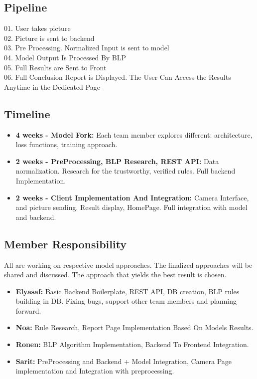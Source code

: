 \documentclass[12pt,a4paper]{article}
\begin{document}
\subsection{Pipeline}
01. User takes picture\\
02. Picture is sent to backend\\
03. Pre Processing. Normalized Input is sent to model\\
04. Model Output Is Processed By BLP\\
05. Full Results are Sent to Front\\
06. Full Conclusion Report is Displayed. The User Can Access the Results Anytime in the Dedicated Page

\subsection{Timeline}
\begin{itemize}
    \item \textbf{4 weeks - Model Fork:} Each team member explores different: architecture, loss functions, training approach.
    \item \textbf{2 weeks - PreProcessing, BLP Research, REST API:} Data normalization. Research for the trustworthy, verified rules. Full backend Implementation.
    \item \textbf{2 weeks - Client Implementation And Integration:} Camera Interface, and picture sending. Result display, HomePage. Full integration with model and backend.
\end{itemize}

\subsection{Member Responsibility}
All are working on respective model approaches. The finalized approaches will be shared and discussed. The approach that yields the best result is chosen.
\begin{itemize}
    \item \textbf{Elyasaf:} Basic Backend Boilerplate, REST API, DB creation, BLP rules building in DB. Fixing bugs, support other team members and planning forward.
    \item \textbf{Noa:} Rule Research, Report Page Implementation Based On Models Results.
    \item \textbf{Ronen:} BLP Algorithm Implementation, Backend To Frontend Integration.
    \item \textbf{Sarit:} PreProcessing and Backend + Model Integration, Camera Page implementation and Integration with preprocessing.
\end{itemize}
\end{document}
